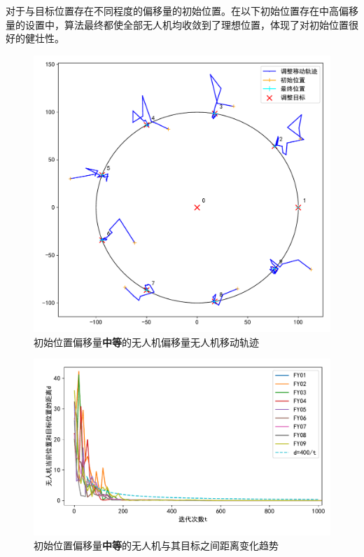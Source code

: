\documentclass[withoutpreface,bwprint]{cumcmthesis} %
\begin{document}
对于与目标位置存在不同程度的偏移量的初始位置。在以下初始位置存在中高偏移量的设置中，算法最终都使全部无人机均收敛到了理想位置，体现了对初始位置很好的健壮性。
\begin{figure}[H]
    \centering
    \includegraphics[width=0.7\linewidth]{figures/c9_noisy1.pdf}
    \caption{初始位置偏移量\textbf{中等}的无人机偏移量无人机移动轨迹}
    \label{fig:Circle9_1}
\end{figure}
\begin{figure}[H]
    \centering
    \includegraphics[width=0.9\linewidth]{figures/c9_noisy1_conv.pdf}
    \caption{初始位置偏移量\textbf{中等}的无人机与其目标之间距离变化趋势}
    \label{fig:Circle9_1_conv}
\end{figure}
\end{document}
